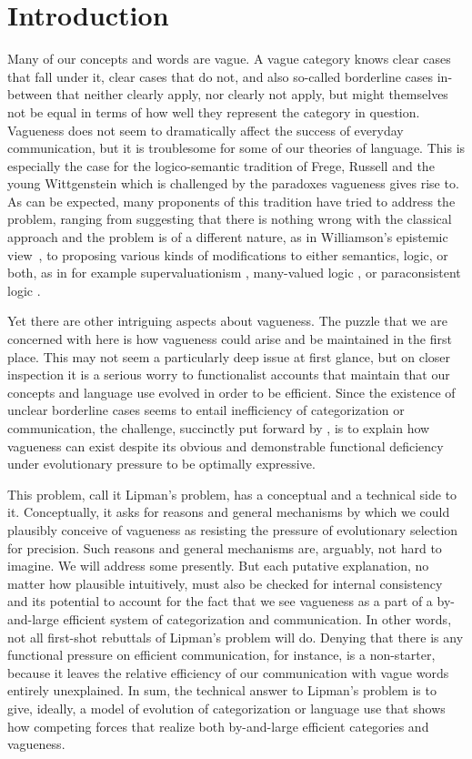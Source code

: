 \section{Introduction}

Many of our concepts and words are vague. A vague category knows clear
cases that fall under it, clear cases that do not, and also so-called
borderline cases in-between that neither clearly apply, nor clearly
not apply, but might themselves not be equal in terms of how well they
represent the category in question. Vagueness does not seem to
dramatically affect the success of everyday communication, but it is
troublesome for some of our theories of language. This is especially the case for the
logico-semantic tradition of Frege, Russell and the young Wittgenstein
which is challenged by the paradoxes vagueness gives rise to. As
can be expected, many proponents of this tradition have tried to address the
problem, ranging from suggesting that there is nothing wrong with the classical
approach and the problem is of a different nature, as in Williamson's epistemic view~\citep*{Williamson1994:Vagueness},
to proposing various kinds of modifications to either semantics, logic, or both, as in for example
supervaluationism \citep{Mehlberg1958,Fine1975}, many-valued logic \citep{Zadeh1975,Machina1976,Edgington1997},
or paraconsistent logic \citep{CobrerosEgre2012:Tolerant-Classi}.

Yet there are other intriguing aspects about vagueness. The
puzzle that we are concerned with here is how vagueness could arise
and be maintained in the first place. This may not seem a particularly
deep issue at first glance, but on closer inspection it is a serious
worry to functionalist accounts that maintain that our concepts and
language use evolved in order to be efficient. Since the existence of
unclear borderline cases seems to entail inefficiency of
categorization or communication, the challenge, succinctly put forward
by \citet{Lipman2009:Why-is-Language}, is to explain how vagueness can
exist despite its obvious and demonstrable functional deficiency under
evolutionary pressure to be optimally expressive.

This problem, call it Lipman's problem, has a conceptual and a
technical side to it. Conceptually, it asks for reasons and general
mechanisms by which we could plausibly conceive of vagueness as
resisting the pressure of evolutionary selection for precision. Such
reasons and general mechanisms are, arguably, not hard to imagine. We
will address some presently. But each putative explanation, no matter
how plausible intuitively, must also be checked for internal
consistency and its potential to account for the fact that we see
vagueness as a part of a by-and-large efficient system of
categorization and communication. In other words, not all first-shot
rebuttals of Lipman's problem will do. Denying that there is any
functional pressure on efficient communication, for instance, is a
non-starter, because it leaves the relative efficiency of our
communication with vague words entirely unexplained. In sum, the
technical answer to Lipman's problem is to give, ideally, a model of
evolution of categorization or language use that shows how competing
forces that realize both by-and-large efficient categories and
vagueness.

